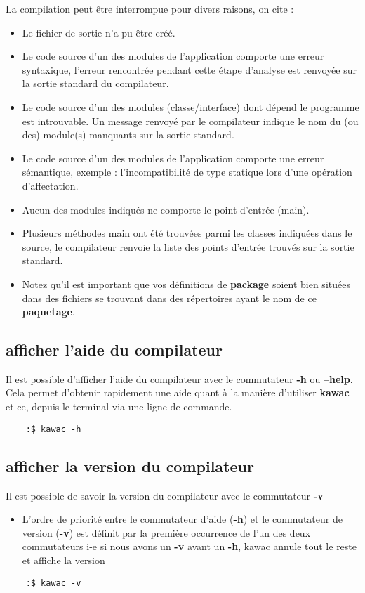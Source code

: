 \documentclass{../res/univ-projet}
\begin{document}
\begin{itemize}
      La compilation peut être interrompue pour divers raisons, on cite :
      \begin{itemize}
        \item Le fichier de sortie n’a pu être créé.
        \item Le code source d’un des modules de l’application
        comporte une erreur syntaxique, l’erreur rencontrée pendant cette
        étape d’analyse est renvoyée sur la sortie standard du compilateur.
        \item Le code source d’un des modules
        (classe/interface) dont dépend le programme est introuvable.
        Un message renvoyé par le compilateur indique le nom du (ou des)
        module(s) manquants sur la sortie standard.
        \item Le code source d’un des modules de l’application
        comporte une erreur sémantique, exemple : l’incompatibilité de type
        statique lors d’une opération d’affectation.
        \item Aucun des modules indiqués ne comporte le
        point d’entrée (main).
        \item Plusieurs méthodes main ont été trouvées parmi
        les classes indiquées dans le source, le compilateur renvoie la liste
        des points d’entrée trouvés sur la sortie standard.
        \item Notez qu'il est important que vos définitions de \textbf{package} soient bien situées
         dans des fichiers se trouvant dans des répertoires ayant le nom de ce \textbf{paquetage}.
      \end{itemize}

    \end{itemize}
  \subsection{afficher l'aide du compilateur}
    Il est possible d'afficher l'aide du compilateur avec le commutateur \textbf{-h} ou \textbf{--help}. Cela permet d'obtenir rapidement une aide quant à la manière d'utiliser \textbf{kawac} et ce, depuis le terminal via une ligne de commande.
  \begin{verbatim}
    :$ kawac -h
  \end{verbatim}

  \subsection{afficher la version du compilateur}
    Il est possible de savoir la version du compilateur avec le commutateur \textbf{-v}
    \begin{itemize}
      \item L’ordre de priorité entre le commutateur d'aide (\textbf{-h}) et le commutateur de version (\textbf{-v}) est définit par la première occurrence de l’un des deux commutateurs i-e si nous avons un \textbf{-v}
      avant un \textbf{-h}, kawac annule tout le reste et affiche la version
  \end{itemize}
  \begin{verbatim}
    :$ kawac -v
  \end{verbatim}
\end{document}
